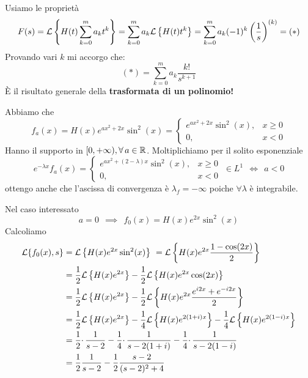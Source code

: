 Usiamo le proprietà
\begin{equation*}
F( s) =\mathcal{L}\left\{H( t)\sum ^{m}_{k=0} a_{k} t^{k}\right\} =\sum ^{m}_{k=0} a_{k}\mathcal{L}\left\{H( t) t^{k}\right\} =\sum ^{m}_{k=0} a_{k}( -1)^{k}\left(\frac{1}{s}\right)^{( k)} =( *)
\end{equation*}
Provando vari $\displaystyle k$ mi accorgo che:
\begin{equation*}
( *) =\sum ^{m}_{k=0} a_{k}\frac{k!}{s^{k+1}}
\end{equation*}
È il risultato generale della \textbf{trasformata di un polinomio!}
\Soluzione

Abbiamo che
\begin{equation*}
f_{a}( x) =H( x) e^{ax^{2} +2x}\sin^{2}( x) =\begin{cases}
e^{ax^{2} +2x}\sin^{2}( x) , & x\geqslant 0\\
0, & x< 0
\end{cases}
\end{equation*}
Hanno il supporto in $\displaystyle [ 0,+\infty ) ,\forall a\in \RR $. Moltiplichiamo per il solito esponenziale
\begin{equation*}
e^{-\lambda x} f_{a}( x) =\begin{cases}
e^{ax^{2} +( 2-\lambda ) x}\sin^{2}( x) , & x\geqslant 0\\
0, & x< 0
\end{cases} \ \in L^{1} \ \ \iff \ \ a< 0
\end{equation*}
ottengo anche che l'ascissa di convergenza è $\displaystyle \lambda _{f} =-\infty $ poiche $\displaystyle \forall \lambda $ è integrabile.

Nel caso interessato
\begin{equation*}
a=0\ \ \implies \ \ f_{0}( x) =H( x) e^{2x}\sin^{2}( x)
\end{equation*}
Calcoliamo
\begin{align*}
\Lc\{f_{0}( x) ,s\} & =\Lc\left\{H( x) e^{2x}\sin^{2}( x)\right\} \ =\Lc\left\{H( x) e^{2x}\frac{1-\cos( 2x)}{2}\right\}\\
 & =\frac{1}{2}\Lc\left\{H( x) e^{2x}\right\} -\frac{1}{2}\Lc\left\{H( x) e^{2x}\cos( 2x)\right\}\\
 & =\frac{1}{2}\Lc\left\{H( x) e^{2x}\right\} -\frac{1}{2}\Lc\left\{H( x) e^{2x}\frac{e^{i2x} +e^{-i2x}}{2}\right\}\\
 & =\frac{1}{2}\Lc\left\{H( x) e^{2x}\right\} -\frac{1}{4}\Lc\left\{H( x) e^{2( 1+i) x}\right\} -\frac{1}{4}\Lc\left\{H( x) e^{2( 1-i) x}\right\}\\
 & =\frac{1}{2} \cdotp \frac{1}{s-2} -\frac{1}{4} \cdotp \frac{1}{s-2( 1+i)} -\frac{1}{4} \cdotp \frac{1}{s-2( 1-i)}\\
 & =\frac{1}{2}\frac{1}{s-2} -\frac{1}{2}\frac{s-2}{( s-2)^{2} +4}
\end{align*}
\Soluzione

